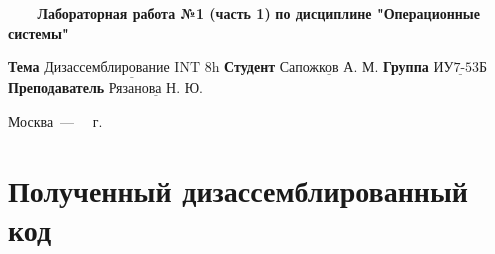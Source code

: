 \documentclass[a4paper,12pt]{article}
\begin{document}
\begin{center}
	\noindent\begin{minipage}{1.3\textwidth}\centering
	\Large\textbf{   ~~~ Лабораторная работа №1 (часть 1)}\newline
	\textbf{по дисциплине "Операционные системы"}\newline\newline\newline
	\end{minipage}
\end{center}

\noindent\textbf{Тема} $\underline{\text{Дизассемблирование INT 8h}}$\newline\newline
\noindent\textbf{Студент} $\underline{\text{Сапожков А. М.}}$\newline\newline
\noindent\textbf{Группа} $\underline{\text{ИУ7-53Б}}$\newline\newline
\noindent\textbf{Преподаватель} $\underline{\text{Рязанова Н. Ю.}}$\newline

\begin{center}
	\vfill
	Москва~---~\the\year
~г.
\end{center}
\clearpage


\section{Полученный дизассемблированный код}
\end{document}
